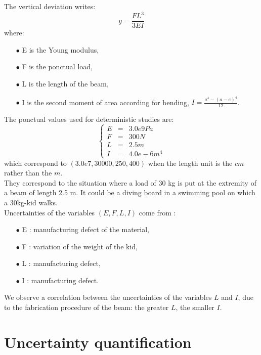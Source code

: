 \documentclass[11pt, french, A4wide]{article}
\theoremstyle{remark}
\theoremstyle{definition}
\begin{document}
The vertical deviation writes:
\begin{equation}\label{relBeam}
  y = \displaystyle \frac{FL^3}{3EI}
\end{equation}
 where:
\begin{itemize}
    \item[$\bullet$]  E is the Young modulus,
    \item[$\bullet$]  F is the ponctual load,
    \item[$\bullet$]  L is the length of the beam,
    \item[$\bullet$]  I is the second moment of area according for bending, $I = \displaystyle \frac{a^4 - (a-e)^4}{12}$.
\end{itemize}
\vspace*{0.2cm}

The ponctual values used for deterministic studies are:
$$
\left\{
\begin{array}{lcl}
 E & = & 3.0e9 Pa\\
 F & = & 300 N\\
 L & = & 2.5m\\
 I & = & 4.0e-6 m^4
\end{array}
\right.
$$
which correspond to $(3.0e7, 30000, 250, 400)$ when the length unit is the $cm$ rather than the $m$.\\

They correspond to the situation where a load of 30 kg is put at the extremity of a beam of length 2.5 m. It could be a diving board in a swimming pool on which a 30kg-kid walks. \\

Uncertainties of the variables $(E,F,L,I)$ come from :
  \begin{itemize}
    \item[$\bullet$]  E : manufacturing defect of the material,
    \item[$\bullet$]  F : variation of the weight of the kid,
    \item[$\bullet$]  L :  manufacturing defect,
    \item[$\bullet$]  I :  manufacturing defect.
  \end{itemize}
\vspace*{0.2cm}

We observe a correlation between the uncertainties of the variables $L$ and $I$, due to the fabrication procedure of the beam: the greater $L$, the smaller $I$.


\newpage
\section{Uncertainty quantification}
\end{document}
